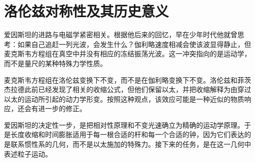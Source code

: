 \begin{classroomqa}
\end{classroomqa}

\section{洛伦兹对称性及其历史意义}

\begin{classroomqa}
\end{classroomqa}

爱因斯坦的进路与电磁学紧密相关。根据他后来的回忆，早在少年时代他就曾思考：如果自己追赶一列光波，会发生什么？伽利略速度相减会使该波显得静止，但麦克斯韦方程组在真空中并没有相应的冻结振荡光波。这一冲突指向的是运动学，而不是量尺的某种特殊力学性质。

\begin{classroomqa}
\end{classroomqa}

麦克斯韦方程组在洛伦兹变换下不变，而不是在伽利略变换下不变。洛伦兹和菲茨杰拉德此前已经发现了相关的收缩公式，但他们保留以太，并把收缩解释为由穿过以太的运动所引起的动力学形变。按照这种观点，该效应可能是一种近似的物质响应，还会有进一步的修正。

爱因斯坦的决定性一步，是把相对性原理和不变光速确立为精确的运动学原理。于是长度收缩和时间膨胀适用于每一根合适的杆和每一个合适的钟，因为它们表达的是联系惯性系的几何，而不是以太施加的特殊力。接下来的任务，是在这一几何中表述粒子运动。
